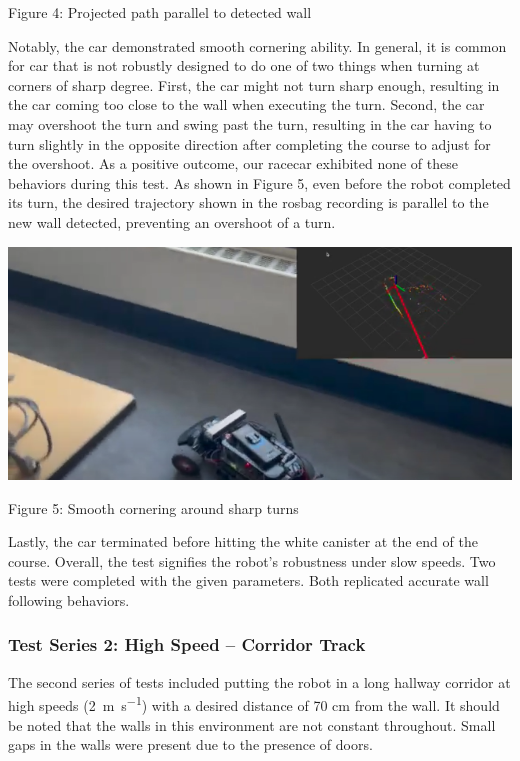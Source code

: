 \documentclass{article}
\begin{document}
\begin{center} 
    Figure 4: Projected path parallel to detected wall 
\end{center}

	Notably, the car demonstrated smooth cornering ability. In general, it is common for car that is not robustly designed to do one of two things when turning at corners of sharp degree. First, the car might not turn sharp enough, resulting in the car coming too close to the wall when executing the turn. Second, the car may overshoot the turn and swing past the turn, resulting in the car having to turn slightly in the opposite direction after completing the course to adjust for the overshoot. As a positive outcome, our racecar exhibited none of these behaviors during this test. As shown in Figure 5, even before the robot completed its turn, the desired trajectory shown in the rosbag recording is parallel to the new wall detected, preventing an overshoot of a turn. \\
	
	\centerline{\includegraphics[width=.5\columnwidth]{pic2.png}}

\begin{center} 
    Figure 5: Smooth cornering around sharp turns 
\end{center}
	
	Lastly, the car terminated before hitting the white canister at the end of the course. Overall, the test signifies the robot's robustness under slow speeds. Two tests were completed with the given parameters. Both replicated accurate wall following behaviors. \\
	
\subsubsection{Test Series 2: High Speed – Corridor Track }

The second series of tests included putting the robot in a long hallway corridor at high speeds (2~\si{\meter\per\second}) with a desired distance of 70 cm from the wall. It should be noted that the walls in this environment are not constant throughout. Small gaps in the walls were present due to the presence of doors. \\
\end{document}
